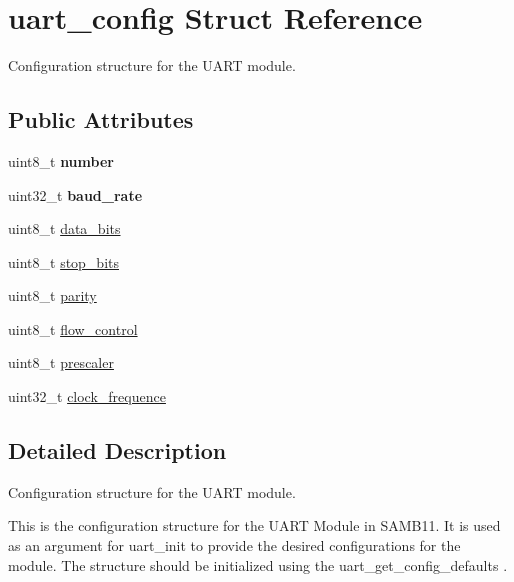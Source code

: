 \hypertarget{structuart__config}{}\section{uart\+\_\+config Struct Reference}
\label{structuart__config}


Configuration structure for the U\+A\+RT module.  


\subsection*{Public Attributes}
\begin{DoxyCompactItemize}
\item 
\mbox{\label{structuart__config_a9f1c46bb7135a0a5dc0bce4f9982dc5f}} 
uint8\+\_\+t {\bfseries number}
\item 
\mbox{\label{structuart__config_a3002fe5cb1c359f93dddb9198356bdcc}} 
uint32\+\_\+t {\bfseries baud\+\_\+rate}
\item 
uint8\+\_\+t \hyperlink{structuart__config_a93ee24cf6669fb4cfece78a53d3ec6c5}{data\+\_\+bits}
\item 
uint8\+\_\+t \hyperlink{structuart__config_a7b98cd63c531110dc3dc99e94db73642}{stop\+\_\+bits}
\item 
uint8\+\_\+t \hyperlink{structuart__config_a9371728729252797880de052aae01089}{parity}
\item 
uint8\+\_\+t \hyperlink{structuart__config_a30a786254694bfca26d7985545b6ffc6}{flow\+\_\+control}
\item 
uint8\+\_\+t \hyperlink{structuart__config_a9fb83c1cf1226b2dc4371bb79699dd71}{prescaler}
\item 
uint32\+\_\+t \hyperlink{structuart__config_a07d92658a8aea18961c39878c11fa689}{clock\+\_\+frequence}
\end{DoxyCompactItemize}


\subsection{Detailed Description}
Configuration structure for the U\+A\+RT module. 

This is the configuration structure for the U\+A\+RT Module in S\+A\+M\+B11. It is used as an argument for uart\+\_\+init to provide the desired configurations for the module. The structure should be initialized using the uart\+\_\+get\+\_\+config\+\_\+defaults . 

